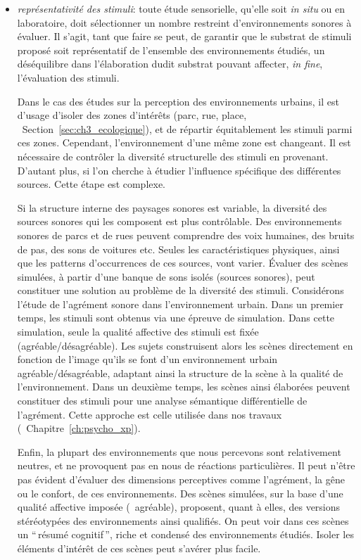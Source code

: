 \begin{itemize}
\item \emph{représentativité des stimuli}: toute étude sensorielle, qu'elle soit \emph{in situ} ou en laboratoire, doit sélectionner un nombre restreint d'environnements sonores à évaluer. Il s'agit, tant que faire se peut, de garantir que le substrat de stimuli proposé soit représentatif de l'ensemble des environnements étudiés, un déséquilibre dans l'élaboration dudit substrat pouvant affecter, \emph{in fine}, l'évaluation des stimuli. 

Dans le cas des études sur la perception des environnements urbains, il est d'usage d'isoler des zones d’intérêts (parc, rue, place, \cf~Section~\ref{sec:ch3_ecologique}), et de répartir équitablement les stimuli parmi ces zones. Cependant, l'environnement d'une même zone est changeant. Il est nécessaire de contrôler la diversité structurelle des stimuli en provenant. D'autant plus, si l'on cherche à étudier l'influence spécifique des différentes sources. Cette étape est complexe.

Si la structure interne des paysages sonores est variable, la diversité des sources sonores qui les composent est plus contrôlable. Des environnements sonores de parcs et de rues peuvent comprendre des voix humaines, des bruits de pas, des sons de voitures etc. Seules les caractéristiques physiques, ainsi que les patterns d'occurrences de ces sources, vont varier. Évaluer des scènes simulées, à partir d'une banque de sons isolés (sources sonores), peut constituer une solution au problème de la diversité des stimuli. Considérons l'étude de l'agrément sonore dans l'environnement urbain. Dans un premier temps, les stimuli sont obtenus via une épreuve de simulation. Dans cette simulation, seule la qualité affective des stimuli est fixée (agréable/désagréable). Les sujets construisent alors les scènes directement en fonction de l'image qu'ils se font d'un environnement urbain agréable/désagréable, adaptant ainsi la structure de la scène à la qualité de l'environnement. Dans un deuxième temps, les scènes ainsi élaborées peuvent constituer des stimuli pour une analyse sémantique différentielle de l'agrément. Cette approche est celle utilisée dans nos travaux (\cf~Chapitre~\ref{ch:psycho_xp}). 

Enfin, la plupart des environnements que nous percevons sont relativement neutres, et ne provoquent pas en nous de réactions particulières. Il peut n'être pas évident d'évaluer des dimensions perceptives comme l'agrément, la gêne ou le confort, de ces environnements. Des scènes simulées, sur la base d'une qualité affective imposée (\eg~agréable), proposent, quant à elles, des versions stéréotypées des environnements ainsi qualifiés. On peut voir dans ces scènes un ``\,résumé cognitif\,'', riche et condensé des environnements étudiés. Isoler les éléments d'intérêt de ces scènes peut s'avérer plus facile.

\end{itemize}

